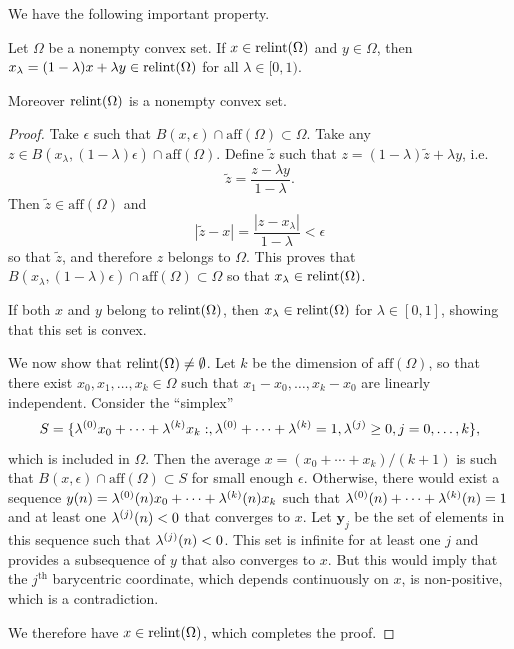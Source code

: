  We have the following important property.
\begin{proposition}
\label{prop:relint.not.empty}
Let $\Omega$ be a nonempty convex set.
If $x\in \mathrm{relint}(\Omega)$ and $y\in \Omega$, then $x_\lambda = (1-\lambda) x + \lambda y\in \mathrm{relint}(\Omega)$ for all $\lambda\in [0, 1)$. 

Moreover  $\mathrm{relint}(\Omega)$ is a nonempty convex set. 
\end{proposition}
\begin{proof}
Take $\epsilon$ such that $B(x, \epsilon) \cap \mathrm{aff}(\Omega)\subset \Omega$. 
Take any $z\in B(x_\lambda, (1-\lambda)\epsilon) \cap \mathrm{aff}(\Omega)$. Define $\tilde z$ such that $z = (1-\lambda)\tilde  z + \lambda y$, i.e.
\[
\tilde z = \frac{z-\lambda y}{1-\lambda}.
\]
Then $\tilde z \in \mathrm{aff}(\Omega)$ and
\[
|\tilde z - x| = \frac{|z-x_\lambda|}{1-\lambda} < \epsilon
\]
so that $\tilde z$, and therefore $z$ belongs to $\Omega$. This proves that $B(x_\lambda, (1-\lambda)\epsilon) \cap \mathrm{aff}(\Omega) \subset \Omega$ so that $x_\lambda\in \mathrm{relint}(\Omega)$.

If both $x$ and $y$ belong to $\mathrm{relint}(\Omega)$, then $x_\lambda \in \mathrm{relint}(\Omega)$ for $\lambda \in [0,1]$, showing that this set is convex.

We now show that $\mathrm{relint}(\Omega)\neq \emptyset$.
Let $k$ be the dimension of $\mathrm{aff}(\Omega)$, so that there exist $x_0, x_1, \ldots, x_k \in \Omega$ such that $x_1-x_0, \ldots, x_k-x_0$ are linearly independent. Consider the  ``simplex''
\[
S = \{ \lambda^{(0)} x_0 + \cdots + \lambda^{(k)} x_k:, \lambda^{(0)}+\cdots + \lambda^{(k)} = 1, \lambda^{(j)}\geq0, j=0, \ldots, k\},
\]
which
is included in $\Omega$. Then the average $x = (x_0 + \cdots +x_k)/(k+1)$ is such that $B(x, \epsilon) \cap \mathrm{aff}(\Omega) \subset S$ for small enough $\epsilon$. Otherwise, there would exist a sequence $y(n) = \lambda^{(0)}(n) x_0 + \cdots + \lambda^{(k)}(n) x_k$ such that $\lambda^{(0)}(n) + \cdots +\lambda^{(k)}(n) = 1$ and at least one $\lambda^{(j)}(n) < 0$ that converges to $x$. Let $\boldsymbol y_j$ be the set of elements in this sequence such that $\lambda^{(j)}(n)<0$. This set is infinite for  at least one $j$ and provides a subsequence of $y$ that also converges to $x$.  But this would imply that the $j^\text{th}$ barycentric coordinate, which depends continuously on $x$, is non-positive, which is a contradiction.

We therefore have $x\in \mathrm{relint}(\Omega)$, which completes the proof. 
\end{proof}

